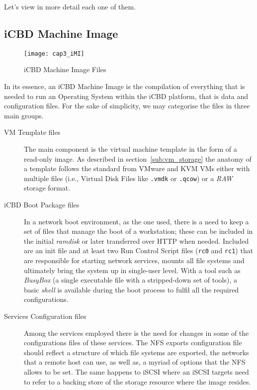 Let's view in more detail each one of them.

\subsection{iCBD Machine Image}
\label{sub:icbd_architecture_imi}

\begin{figure}[htbp]
	\centering
	\texttt{[image: cap3\_iMI]}
	\caption{iCBD Machine Image Files}
	\label{fig:icbd_iMI_files}
\end{figure}

In its essence, an iCBD Machine Image is the compilation of everything that is needed to run an Operating System within the iCBD platform, that is data and configuration files. For the sake of simplicity, we may categorise the files in three main groups.

\begin{description}
	\item [VM Template files] The main component is the virtual machine template in the form of a read-only image. As described in section~\ref{sub:vm_storage} the anatomy of a template follows the standard from VMware and KVM VMs either with multiple files (i.e., Virtual Disk Files like \texttt{.vmdk} or \texttt{.qcow}) or a \textit{RAW} storage format.
	\item [iCBD Boot Package files] In a network boot environment, as the one used, there is a need to keep a set of files that manage the boot of a workstation; these can be included in the initial \textit{ramdisk} or later transferred over HTTP when needed. Included are an init file and at least two Run Control Script files (\texttt{rc0} and \texttt{rc1}) that are responsible for starting network services, mounts all file systems and ultimately bring the system up in single-user level. With a tool such as \textit{BusyBox} (a single executable file with a stripped-down set of tools), a basic \textit{shell} is available during the boot process to fulfil all the required configurations.
	\item [Services Configuration files] Among the services employed there is the need for changes in some of the configurations files of these services. The NFS exports configuration file should reflect a structure of which file systems are exported, the networks that a remote host can use, as well as, a myriad of options that the NFS allows to be set. The same happens to iSCSI where an iSCSI targets need to refer to a backing store of the storage resource where the image resides. 
\end{description}

